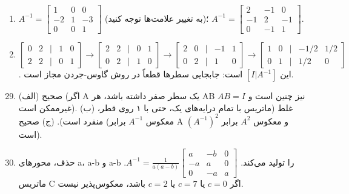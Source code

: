\documentclass[12pt,a4paper]{article}
\begin{document}
{\begin{enumerate}
			\item $A^{-1} = \begin{bmatrix} 1 & 0 & 0 \\ -2 & 1 & -3 \\ 0 & 0 & 1 \end{bmatrix}$ (به تغییر علامت‌ها توجه کنید)؛ $A^{-1} = \begin{bmatrix} 2 & -1 & 0 \\ -1 & 2 & -1 \\ 0 & -1 & 1 \end{bmatrix}$.
			
			\item $\begin{bmatrix} 0 & 2 & | & 1 & 0 \\ 2 & 2 & | & 0 & 1 \end{bmatrix} \to \begin{bmatrix} 2 & 2 & | & 0 & 1 \\ 0 & 2 & | & 1 & 0 \end{bmatrix} \to \begin{bmatrix} 2 & 0 & | & -1 & 1 \\ 0 & 2 & | & 1 & 0 \end{bmatrix} \to \begin{bmatrix} 1 & 0 & | & -1/2 & 1/2 \\ 0 & 1 & | & 1/2 & 0 \end{bmatrix}$. این $[I|A^{-1}]$ است: جابجایی سطرها قطعاً در روش گاوس-جردن مجاز است.
		\end{enumerate}
		
		
		\begin{enumerate}
			\setcounter{enumi}{28}
			\item (الف) صحیح (اگر A یک سطر صفر داشته باشد، هر AB نیز چنین است و $AB=I$ غیرممکن است).
			(ب) غلط (ماتریس با تمام درایه‌های یک، حتی با ۱ روی قطر، منفرد است).
			(ج) صحیح (معکوس $A^{-1}$ برابر A و معکوس $A^2$ برابر $(A^{-1})^2$ است).
			
			\item حذف، محورهای a، a-b و a-b را تولید می‌کند. $A^{-1} = \frac{1}{a(a-b)}\begin{bmatrix} a & -b & 0 \\ -a & a & 0 \\ 0 & -a & a \end{bmatrix}$. ماتریس C اگر $c=0$ یا $c=7$ یا $c=2$ باشد، معکوس‌پذیر نیست.
			

\end{enumerate}}
\end{document}
